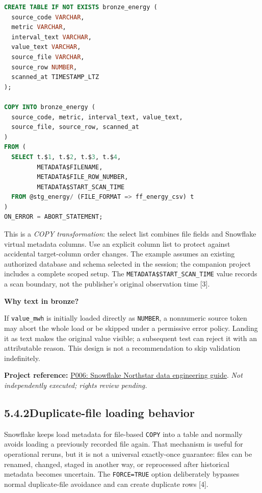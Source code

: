 \documentclass[11pt,twoside]{article}
\newcommand{\topic}[2]{\subsection*{#1\quad #2}}
\newcommand{\repo}[2]{\par\begingroup\fontsize{8.0}{9.6}\selectfont\sffamily\color{inkgray}\textbf{Project reference:} \href{#2}{#1}. \textit{Not independently executed; rights review pending.}\par\endgroup}
\begin{document}
\begin{lstlisting}[language=SQL,caption={An auditable bronze target for unchanged source fields.}]
CREATE TABLE IF NOT EXISTS bronze_energy (
  source_code VARCHAR,
  metric VARCHAR,
  interval_text VARCHAR,
  value_text VARCHAR,
  source_file VARCHAR,
  source_row NUMBER,
  scanned_at TIMESTAMP_LTZ
);

COPY INTO bronze_energy (
  source_code, metric, interval_text, value_text,
  source_file, source_row, scanned_at
)
FROM (
  SELECT t.$1, t.$2, t.$3, t.$4,
         METADATA$FILENAME,
         METADATA$FILE_ROW_NUMBER,
         METADATA$START_SCAN_TIME
  FROM @stg_energy/ (FILE_FORMAT => ff_energy_csv) t
)
ON_ERROR = ABORT_STATEMENT;
\end{lstlisting}
This is a \emph{COPY transformation}: the select list combines file fields and Snowflake virtual metadata columns. Use an explicit column list to protect against accidental target-column order changes. The example assumes an existing authorized database and schema selected in the session; the companion project includes a complete scoped setup. The \texttt{METADATA\$START\_SCAN\_TIME} value records a scan boundary, not the publisher's original observation time [3].

\begin{insight}\textbf{Why text in bronze?}\par
If \texttt{value\_mwh} is initially loaded directly as \texttt{NUMBER}, a nonnumeric source token may abort the whole load or be skipped under a permissive error policy. Landing it as text makes the original value visible; a subsequent test can reject it with an attributable reason. This design is not a recommendation to skip validation indefinitely.\end{insight}
\repo{P006: Snowflake Northstar data engineering guide}{https://github.com/Snowflake-Labs/sfguide-snowflake-northstar-data-engineering}
\newpage
\topic{5.4.2}{Duplicate-file loading behavior}
Snowflake keeps load metadata for file-based \texttt{COPY} into a table and normally avoids loading a previously recorded file again. That mechanism is useful for operational reruns, but it is not a universal exactly-once guarantee: files can be renamed, changed, staged in another way, or reprocessed after historical metadata becomes uncertain. The \texttt{FORCE=TRUE} option deliberately bypasses normal duplicate-file avoidance and can create duplicate rows [4].
\end{document}
